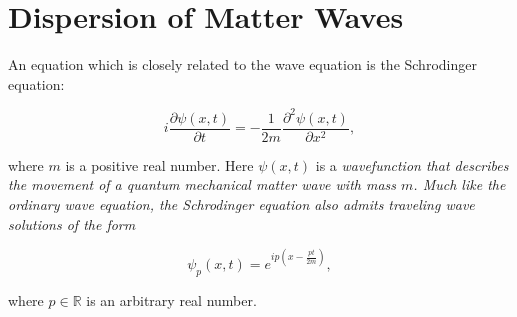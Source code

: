 %
% 

\section{Dispersion of Matter Waves}
An equation which is closely related to the wave equation is the Schrodinger equation:

$$i\frac{\partial\psi(x,t)}{\partial t}=-\frac{1}{2m}\frac{\partial^{2}\psi(x,t)}{\partial x^{2}},$$

where $m$ is a positive real number. Here $\psi(x,t)$ is a \it wavefunction \rm that describes the movement of a quantum mechanical matter wave with mass $m$. Much like the ordinary wave equation, the Schrodinger equation also admits traveling wave solutions of the form

$$\psi_{p}(x,t)=e^{ip\left(x-\frac{pt}{2m}\right)},$$

where $p\in\mathbb{R}$ is an arbitrary real number.

